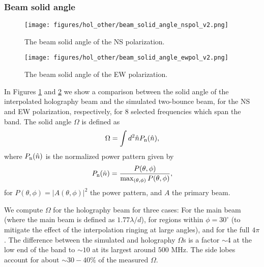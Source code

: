 
\subsubsection{Beam solid angle}

\begin{figure}[h]
\begin{center}
\texttt{[image: figures/hol\_other/beam\_solid\_angle\_nspol\_v2.png]}
\caption{The beam solid angle of the NS polarization. \label{bsans}}
\end{center}
\end{figure}

\begin{figure}[h]
\begin{center}
\texttt{[image: figures/hol\_other/beam\_solid\_angle\_ewpol\_v2.png]}
\caption{The beam solid angle of the EW polarization. \label{bsaew}}
\end{center}
\end{figure}

In Figures \ref{bsans} and \ref{bsaew} we show a comparison between the solid angle of the interpolated holography beam and the simulated two-bounce beam, for the NS and EW polarization, respectively, for 8 selected frequencies which span the band. The solid angle $\Omega$ is defined as
\begin{equation}
\Omega = \int d^2 \hat{n} P_{\rm n}(\hat{n}), \label{Omega}
\end{equation}
where $P_{\rm n}(\hat{n})$ is the normalized power pattern given by
\begin{equation}
P_{\rm n}(\hat{n}) = \frac{P(\theta, \phi)}{\max_{(\theta, \phi)} {P(\theta, \phi)}},
\end{equation}
for $P(\theta, \phi) = |A(\theta, \phi)|^2$ the power pattern, and $A$ the primary beam.

We compute $\Omega$ for the holography beam for three cases: For the main beam (where the main beam is defined as $1.77\lambda/d$),  for regions within $\phi = 30^\circ$ (to mitigate the effect of the interpolation ringing at large angles), and for the full $4\pi$. The difference between the simulated and holography $\Omega$s is a factor $\sim 4$ at the low end of the band to $\sim 10$ at its largest around $500$ MHz.  The side lobes account for about $\sim 30-40\%$ of the measured $\Omega$.

